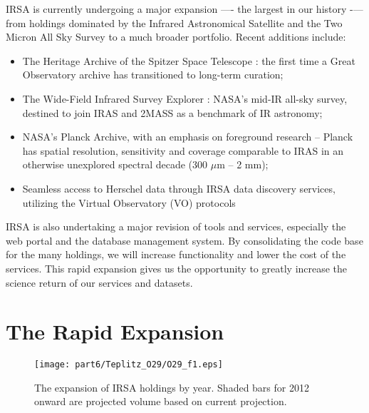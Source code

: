 IRSA is currently undergoing a major expansion —- the largest in our history -— from holdings dominated by the Infrared Astronomical Satellite \citep[IRAS][]{neugebauer84} and the Two Micron All Sky Survey \citep[2MASS][]{skrutskie06} to a much broader portfolio. Recent additions include:

\begin{itemize}

\item The Heritage Archive of the Spitzer Space Telescope \citep[SHA][]{werner04}: the first time a Great Observatory archive has transitioned to long-term curation; 
\item The Wide-Field Infrared Survey Explorer \citep[WISE][]{wright10}: NASA’s mid-IR all-sky survey, destined to join IRAS and 2MASS as a benchmark of IR astronomy; 
\item NASA's Planck Archive, with an emphasis on foreground research -- Planck \citet{planck11} has spatial resolution, sensitivity and coverage comparable to IRAS in an otherwise unexplored spectral decade (300 $\mu$m – 2 mm); 
\item Seamless access to Herschel data through IRSA data discovery services, utilizing the Virtual Observatory (VO) protocols

\end{itemize}

IRSA is also undertaking a major revision of tools and services, especially the web portal and the database management system. By consolidating the code base for the many holdings, we will increase functionality and lower the cost of the services. This rapid expansion gives us the opportunity to greatly increase the science return of our services and datasets.

\section{The Rapid Expansion}

\begin{figure}[t]

\centering
\texttt{[image: part6/Teplitz\_O29/O29\_f1.eps]}
\caption{The expansion of IRSA holdings by year.  Shaded  bars for 2012 onward are projected volume based on current projection.}
\end{figure}

